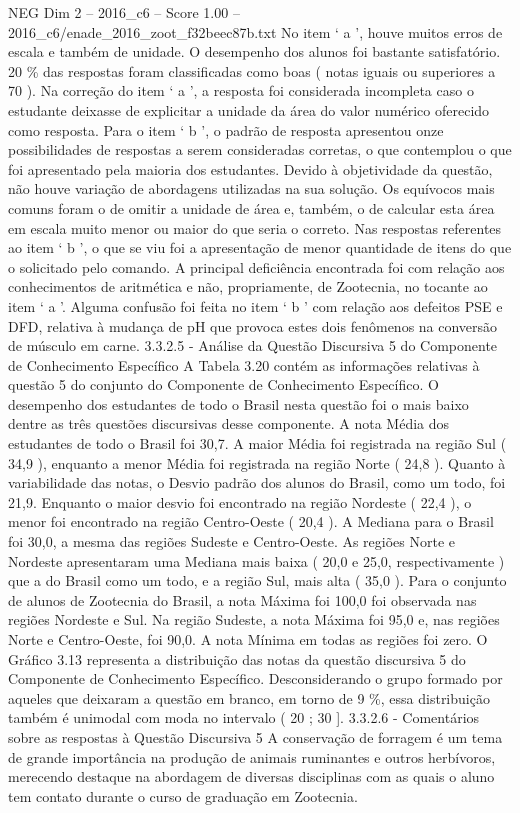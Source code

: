 \begin{textsample}{NEG Dim 2 – 2016\_c6 – Score 1.00 – 2016\_c6/enade\_2016\_zoot\_f32beec87b.txt}
No item ‘ a ’, houve muitos erros de escala e também de unidade.
O desempenho dos alunos foi bastante satisfatório. 20 \% das respostas foram classificadas como boas ( notas iguais ou superiores a 70 ).
Na correção do item ‘ a ’, a resposta foi considerada incompleta caso o estudante deixasse de explicitar a unidade da área do valor numérico oferecido como resposta.
Para o item ‘ b ’, o padrão de resposta apresentou onze possibilidades de respostas a serem consideradas corretas, o que contemplou o que foi apresentado pela maioria dos estudantes.
Devido à objetividade da questão, não houve variação de abordagens utilizadas na sua solução.
Os equívocos mais comuns foram o de omitir a unidade de área e, também, o de calcular esta área em escala muito menor ou maior do que seria o correto.
Nas respostas referentes ao item ‘ b ’, o que se viu foi a apresentação de menor quantidade de itens do que o solicitado pelo comando.
A principal deficiência encontrada foi com relação aos conhecimentos de aritmética e não, propriamente, de Zootecnia, no tocante ao item ‘ a ’.
Alguma confusão foi feita no item ‘ b ’ com relação aos defeitos PSE e DFD, relativa à mudança de pH que provoca estes dois fenômenos na conversão de músculo em carne. 3.3.2.5 - Análise da Questão Discursiva 5 do Componente de Conhecimento Específico A Tabela 3.20 contém as informações relativas à questão 5 do conjunto do Componente de Conhecimento Específico.
O desempenho dos estudantes de todo o Brasil nesta questão foi o mais baixo dentre as três questões discursivas desse componente.
A nota Média dos estudantes de todo o Brasil foi 30,7.
A maior Média foi registrada na região Sul ( 34,9 ), enquanto a menor Média foi registrada na região Norte ( 24,8 ).
Quanto à variabilidade das notas, o Desvio padrão dos alunos do Brasil, como um todo, foi 21,9.
Enquanto o maior desvio foi encontrado na região Nordeste ( 22,4 ), o menor foi encontrado na região Centro-Oeste ( 20,4 ).
A Mediana para o Brasil foi 30,0, a mesma das regiões Sudeste e Centro-Oeste.
As regiões Norte e Nordeste apresentaram uma Mediana mais baixa ( 20,0 e 25,0, respectivamente ) que a do Brasil como um todo, e a região Sul, mais alta ( 35,0 ).
Para o conjunto de alunos de Zootecnia do Brasil, a nota Máxima foi 100,0 foi observada nas regiões Nordeste e Sul.
Na região Sudeste, a nota Máxima foi 95,0 e, nas regiões Norte e Centro-Oeste, foi 90,0.
A nota Mínima em todas as regiões foi zero.
O Gráfico 3.13 representa a distribuição das notas da questão discursiva 5 do Componente de Conhecimento Específico.
Desconsiderando o grupo formado por aqueles que deixaram a questão em branco, em torno de 9 \%, essa distribuição também é unimodal com moda no intervalo ( 20 ; 30 ]. 3.3.2.6 - Comentários sobre as respostas à Questão Discursiva 5 A conservação de forragem é um tema de grande importância na produção de animais ruminantes e outros herbívoros, merecendo destaque na abordagem de diversas disciplinas com as quais o aluno tem contato durante o curso de graduação em Zootecnia.

\end{textsample}
